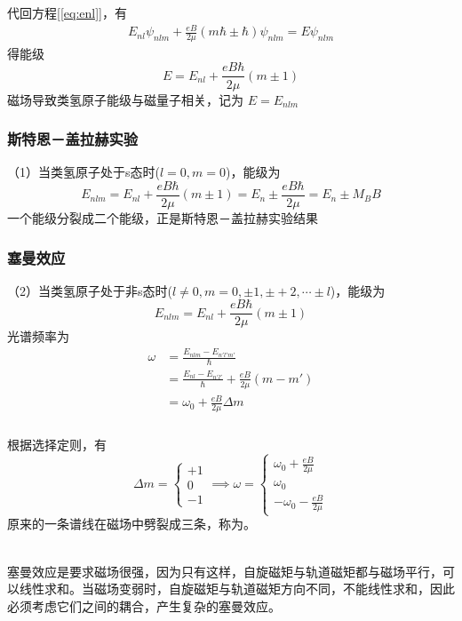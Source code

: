 \begin{frame}[label=current]
  \frametitle{}
  代回方程[\ref{eq:enl}]，有
  \[\begin{aligned}
    E_{nl} \psi _{nlm} + \frac{eB}{2 \mu } (m \hbar \pm \hbar) 
      \psi _{nlm}  = E \psi _{nlm}
  \end{aligned}\]
  得能级
  \[ E = E_{nl} + \frac{eB\hbar}{2 \mu } (m  \pm 1)  \]
  磁场导致类氢原子能级与磁量子相关，记为 $ E = E_{nlm}  $  
\end{frame} 

\begin{frame}[label=current]
  \frametitle{斯特恩－盖拉赫实验}
  \分 （1）当类氢原子处于s态时($l=0, m=0$)，能级为 
  \[E_{nlm} = E_{nl} + \frac{eB\hbar}{2 \mu } (m  \pm 1) = E_{n} \pm \frac{eB\hbar}{2 \mu } = E_{n} \pm M_B B\]
  一个能级分裂成二个能级，正是斯特恩－盖拉赫实验结果
\end{frame} 

\begin{frame}[label=current]
  \frametitle{塞曼效应}
（2）当类氢原子处于非s态时($l\ne 0, m=0,\pm 1, \pm+2, \cdots \pm l$)，能级为 
\[E_{nlm} = E_{nl} + \frac{eB\hbar}{2 \mu } (m  \pm 1) \]
光谱频率为
\[
  \begin{aligned}
    \omega &= \frac{E_{nlm} - E_{n'l'm'}}{\hbar} \\
    &=  \frac{E_{nl} - E_{n'l'}}{\hbar} + \frac{eB}{2 \mu } (m-m')\\
    &= \omega _0 + \frac{eB}{2 \mu } \Delta m 
  \end{aligned}
  \]
\end{frame} 

\begin{frame}[label=current]
  \frametitle{}
根据选择定则，有
$$ \Delta m  = \begin{cases}
    +1 \\
    0 \\
    -1
\end{cases} \implies   \omega  = \begin{cases}
  \omega_0 +\frac{eB}{2 \mu }  \\
  \omega _0 \\
  -\omega_0 -\frac{eB}{2 \mu }
\end{cases} $$ 
原来的一条谱线在磁场中劈裂成三条，称为\emf[塞曼效应]。

~~\\ 
塞曼效应是要求磁场很强，因为只有这样，自旋磁矩与轨道磁矩都与磁场平行，可以线性求和。当磁场变弱时，自旋磁矩与轨道磁矩方向不同，不能线性求和，因此必须考虑它们之间的耦合，产生复杂的塞曼效应。
\end{frame} 

